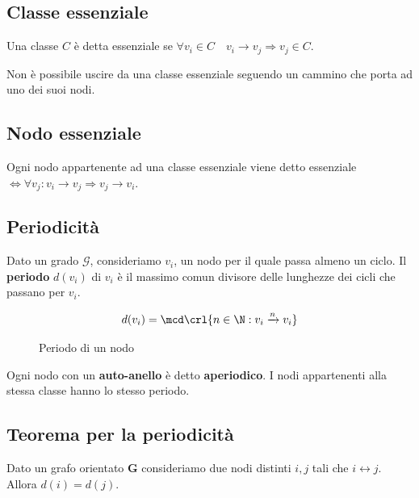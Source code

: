 \documentclass[\main/main.tex]{subfiles}
\begin{document}
\subsection{Classe essenziale}
Una classe \(C\) è detta essenziale se \(\forall v_i \in C \quad v_i \rightarrow v_j \Rightarrow v_j \in C\).

Non è possibile uscire da una classe essenziale seguendo un cammino che porta ad uno dei suoi nodi.

\subsection{Nodo essenziale}
Ogni nodo appartenente ad una classe essenziale viene detto essenziale \(\Leftrightarrow \forall v_j: v_i \rightarrow v_j \Rightarrow v_j \rightarrow v_i\).

\subsection{Periodicità}
Dato un grado \(\mathcal{G}\), consideriamo \(v_i\), un nodo per il quale passa almeno un ciclo. Il \textbf{periodo} \(d(v_i)\) di \(v_i\) è il massimo comun divisore delle lunghezze dei cicli che passano per \(v_i\).

\begin{figure}
  \[
    d(v_i) = \mcd\crl{n \in \N: v_i\xrightarrow{n}v_i}
  \]
  \caption{Periodo di un nodo}
\end{figure}

Ogni nodo con un \textbf{auto-anello} è detto \textbf{aperiodico}. I nodi appartenenti alla stessa classe hanno lo stesso periodo.

\subsection{Teorema per la periodicità}
\begin{theorem}
  Dato un grafo orientato \(\bm{G}\) consideriamo due nodi distinti \(i,j\) tali che \(i \leftrightarrow j\). Allora \(d(i)=d(j)\).
\end{theorem}
\end{document}
